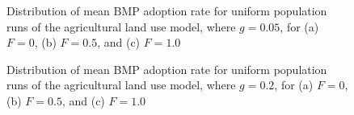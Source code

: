 \begin{figure}
    \hfill
    \hfill
    \caption{Distribution of mean BMP adoption rate for uniform population
        runs of the agricultural land use model, where $g=0.05$,
        for (a) $F=0$, (b) $F=0.5$, and (c) $F=1.0$}
    \label{fig:farm_res_g05}
\end{figure}

\begin{figure}
    \hfill
    \hfill
    \caption{Distribution of mean BMP adoption rate for uniform population
        runs of the agricultural land use model, where $g=0.2$,
        for (a) $F=0$, (b) $F=0.5$, and (c) $F=1.0$}
    \label{fig:farm_res_g20}
\end{figure}

